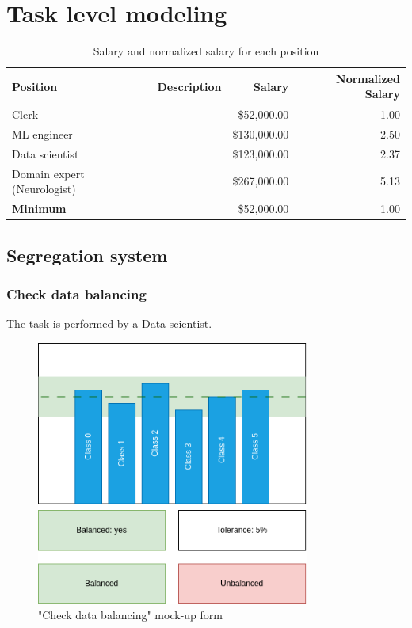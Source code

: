 \section{Task level modeling}

\begin{table}[H]
\centering
\begin{tabularx}{\textwidth}{|l|X|r|r|}
\hline
\textbf{Position} & \textbf{Description} & \textbf{Salary} & \textbf{Normalized Salary} \\
\hline
Clerk & & \$52,000.00 & 1.00 \\
\hline
ML engineer & & \$130,000.00 & 2.50 \\
\hline
Data scientist & & \$123,000.00 & 2.37 \\
\hline
Domain expert (Neurologist) & & \$267,000.00 & 5.13 \\
\hline
\multicolumn{2}{|l|}{\textbf{Minimum}} & \$52,000.00 & 1.00 \\
\hline
\end{tabularx}
\caption{Salary and normalized salary for each position}
\label{table:salary}
\end{table}

\subsection{Segregation system}

\subsubsection{Check data balancing}

The task is performed by a Data scientist.

\begin{figure}[H]
\centering
\includegraphics[width=0.8\textwidth]{figures/check_data_balancing.png}
\caption{"Check data balancing" mock-up form}
\end{figure}

